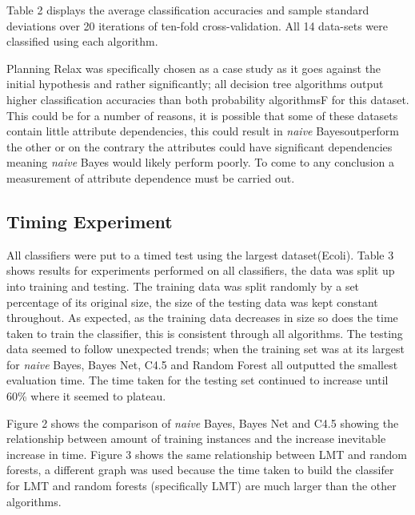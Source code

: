 \documentclass{cmppgr}
\begin{document}
Table 2 displays the average classification accuracies and sample standard deviations over 20 iterations of ten-fold cross-validation. All 14 data-sets were classified using each algorithm.

Planning Relax was specifically chosen as a case study as it goes against the initial hypothesis and rather significantly; all decision tree algorithms output higher classification accuracies than both probability algorithmsF for this dataset. This could be for a number of reasons, 
it is possible that some of these datasets contain little attribute dependencies, this could result in \textit{naive} Bayesoutperform the other or on the contrary the attributes could have significant dependencies meaning \textit{naive} Bayes would likely perform poorly. To come to any conclusion a measurement of attribute dependence must be carried out.


\subsection{Timing Experiment}
All classifiers were put to a timed test using the largest dataset(Ecoli). Table 3 shows results for experiments performed on all classifiers, the data was split up into training and testing. The training data was split randomly by a set percentage of its original size, the size of the testing data was kept constant throughout. As expected, as the training data decreases in size so does the time taken to train the classifier, this is consistent through all algorithms. The testing data seemed to follow unexpected trends; when the training set was at its largest for \textit{naive} Bayes, Bayes Net, C4.5 and Random Forest all outputted the smallest evaluation time. The time taken for the testing set continued to increase until 60\% where it seemed to plateau.

Figure 2 shows the comparison of \textit{naive} Bayes, Bayes Net and C4.5 showing the relationship between amount of training instances and the increase inevitable increase in time. Figure 3 shows the same relationship between LMT and random forests, a different graph was used because the time taken to build the classifer for LMT and random forests (specifically LMT) are much larger than the other algorithms.
\end{document}
